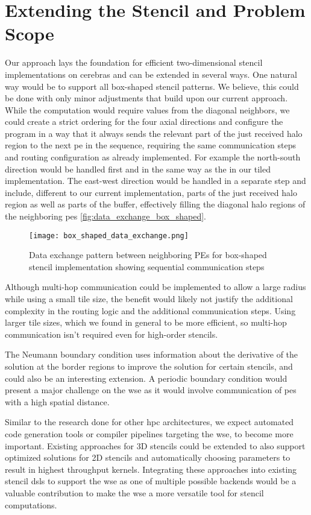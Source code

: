 \section{Extending the Stencil and Problem Scope}
Our approach lays the foundation for efficient two-dimensional stencil implementations on cerebras and can be extended in several ways.
One natural way would be to support all box-shaped stencil patterns.
We believe, this could be done with only minor adjustments that build upon our current approach.
While the computation would require values from the diagonal neighbors, we could create a strict ordering for the four axial directions and configure the program in a way that it always sends the relevant part of the just received halo region to the next \ac{pe} in the sequence, requiring the same communication steps and routing configuration as already implemented. For example the north-south direction would be handled first and in the same way as the in our tiled implementation. The east-west direction would be handled in a separate step and include, different to our current implementation, parts of the just received halo region as well as parts of the buffer, effectively filling the diagonal halo regions of the neighboring \acp{pe} \autoref{fig:data_exchange_box_shaped}.

\begin{figure}[h]
    \centering
    \texttt{[image: box\_shaped\_data\_exchange.png]}
    \caption{Data exchange pattern between neighboring PEs for box-shaped stencil implementation showing sequential communication steps}
    \label{fig:data_exchange_box_shaped}
\end{figure}

Although multi-hop communication could be implemented to allow a large radius while using a small tile size, the benefit would likely not justify the additional complexity in the routing logic and the additional communication steps. Using larger tile sizes, which we found in general to be more efficient, so multi-hop communication isn't required even for high-order stencils.

The Neumann boundary condition uses information about the derivative of the solution at the border regions to improve the solution for certain stencils, and could also be an interesting extension. A periodic boundary condition would present a major challenge on the \ac{wse} as it would involve communication of \acp{pe} with a high spatial distance. 

Similar to the research done for other \ac{hpc} architectures, we expect automated code generation tools or compiler pipelines targeting the \ac{wse}, to become more important.
Existing approaches for 3D stencils\cite{sai2024automated} could be extended to also support optimized solutions for 2D stencils and automatically choosing parameters to result in highest throughput kernels.
Integrating these approaches into existing stencil \acp{dsl} to support the \ac{wse} as one of multiple possible backends would be a valuable contribution to make the \ac{wse} a more versatile tool for stencil computations.